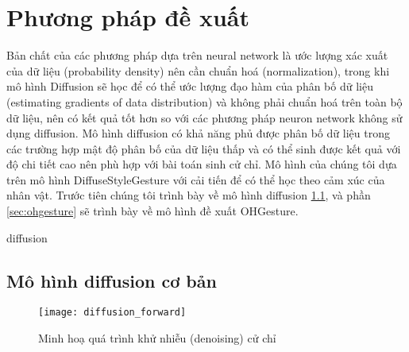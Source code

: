 %   

\chapter{Phương pháp đề xuất}
\label{Chapter3}


Bản chất của các phương pháp dựa trên neural network là ước lượng xác xuất của dữ liệu (probability density) nên cần chuẩn hoá (normalization), trong khi mô hình Diffusion sẽ học để có thể ước lượng đạo hàm của phân bố dữ liệu (estimating gradients of data distribution) và không phải chuẩn hoá trên toàn bộ dữ liệu, nên có kết quả tốt hơn so với các phương pháp neuron network không sử dụng diffusion.
Mô hình diffusion có khả năng phủ được phân bố dữ liệu trong các trường hợp mật độ phân bố của dữ liệu thấp  và có thể sinh được kết quả với độ chi tiết cao nên phù hợp với bài toán sinh cử chỉ. Mô hình của chúng tôi dựa trên mô hình DiffuseStyleGesture \cite{yang2022DiffuseStyleGestureplus} với cải tiến để có thể học theo cảm xúc của nhân vật. Trước tiên chúng tôi trình bày về mô hình diffusion \ref{sec:summary_diffusion}, và phần \ref{sec:ohgesture} sẽ trình bày về mô hình đề xuất OHGesture. 

diffusion
\section{Mô hình diffusion cơ bản}
\label{sec:summary_diffusion}

\begin{figure}
	\centering
	\texttt{[image: diffusion\_forward]}
	\caption{Minh hoạ quá trình khử nhiễu (denoising) cử chỉ}
	\label{fig:diffusion_forward}
\end{figure}


